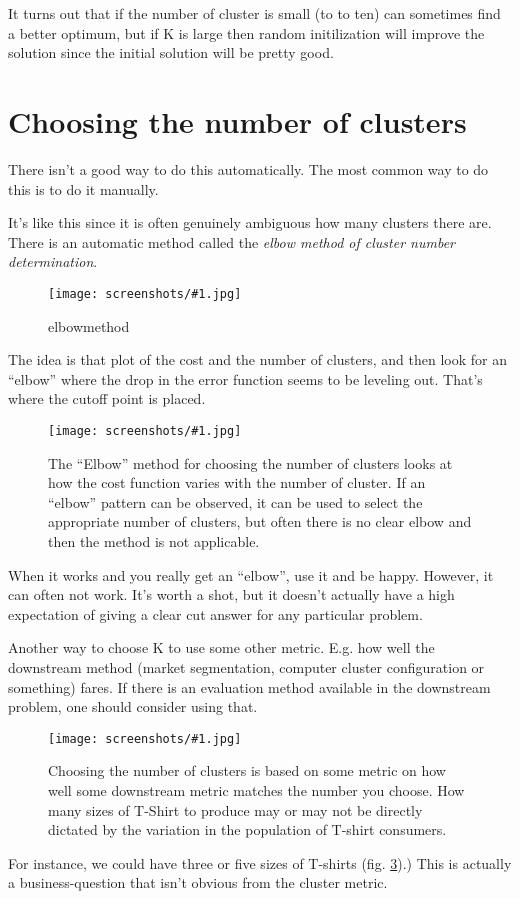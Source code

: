 \documentclass[a4, 12pt, english, USenglish]{scrreprt}
\newcommand{\screenshot}[2]{
\begin{figure}[htb]
\texttt{[image: screenshots/\#1.jpg]}
\label{#1}
\caption{#2}
\end{figure}}
\newcommand{\idx}[1]{{\em #1}\index{#1}}
\begin{document}
It turns out that if the number of cluster is small (to to ten) can
sometimes find a better optimum, but if K is large then random
initilization will improve the solution since the initial solution
will be pretty good.

\section{Choosing the number of clusters}

There isn't a good way to do this automatically.  The most common way
to do this is to do it manually. 

It's like this since it is often genuinely ambiguous how many clusters
there are.  There is an automatic method called the \idx{elbow method
  of cluster number determination}.

\screenshot{elbowmethod}{elbowmethod}

The idea is that plot of the cost and the number of clusters, and then
look for an ``elbow'' where the drop in the error function seems to be
leveling out.  That's where the cutoff point is placed.

\screenshot{elbowmethod}{The ``Elbow'' method for choosing the number
  of clusters looks at how the cost function varies with the number of
cluster.  If an ``elbow'' pattern can be observed, it can be used to
select the appropriate number of clusters, but often there is no clear
elbow and then the method is not applicable.}

When it works and you really get an ``elbow'', use it and be happy.
However, it can often not work.  It's worth a shot, but it doesn't
actually have a high expectation of giving a clear cut answer for any
particular problem.

Another way to choose K to use some other metric. E.g. how well the
downstream method (market segmentation, computer cluster configuration
or something) fares.  If there is an evaluation method available in
the downstream problem, one should consider using that.

\screenshot{tshirtclustersize}{Choosing the number of clusters is
  based on some metric on how well some downstream metric matches the
  number you choose.  How many sizes of T-Shirt to produce may or may
  not be directly dictated by the variation in the population of
  T-shirt consumers.}

For instance, we could have three or five sizes of T-shirts
(fig. \ref{tshirtclustersize}).)  This is actually a business-question
that isn't obvious from the cluster metric.
\end{document}
